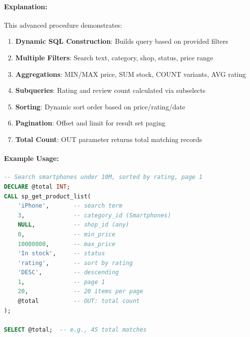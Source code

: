 \paragraph{Explanation:}
This advanced procedure demonstrates:
\begin{enumerate}
    \item \textbf{Dynamic SQL Construction}: Builds query based on provided filters
    \item \textbf{Multiple Filters}: Search text, category, shop, status, price range
    \item \textbf{Aggregations}: MIN/MAX price, SUM stock, COUNT variants, AVG rating
    \item \textbf{Subqueries}: Rating and review count calculated via subselects
    \item \textbf{Sorting}: Dynamic sort order based on price/rating/date
    \item \textbf{Pagination}: Offset and limit for result set paging
    \item \textbf{Total Count}: OUT parameter returns total matching records
\end{enumerate}

\paragraph{Example Usage:}

\begin{lstlisting}[language=SQL]
-- Search smartphones under 10M, sorted by rating, page 1
DECLARE @total INT;
CALL sp_get_product_list(
    'iPhone',       -- search term
    3,              -- category_id (Smartphones)
    NULL,           -- shop_id (any)
    0,              -- min_price
    10000000,       -- max_price
    'In stock',     -- status
    'rating',       -- sort by rating
    'DESC',         -- descending
    1,              -- page 1
    20,             -- 20 items per page
    @total          -- OUT: total count
);

SELECT @total;  -- e.g., 45 total matches
\end{lstlisting}
